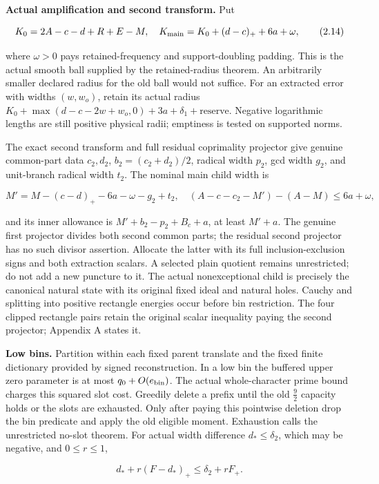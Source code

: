 \documentclass[11pt,a4paper]{article}
\begin{document}
\textbf{Actual amplification and second transform.} Put

\[
K_0=2A-c-d+R+E-M,\quad
K_{\rm main}=K_0+(d-c)_++6a+\omega,
\tag{2.14}
\]

where \(\omega>0\) pays retained-frequency and support-doubling padding.
This is the actual smooth ball supplied by the retained-radius theorem.
An arbitrarily smaller declared radius for the old ball would not
suffice. For an extracted error with widths \((w,w_o)\), retain its
actual radius \(K_0+\max(d-c-2w+w_o,0)+3a+\delta_1+\text{reserve}\).
Negative logarithmic lengths are still positive physical radii;
emptiness is tested on supported norms.

The exact second transform and full residual coprimality projector give
genuine common-part data \(c_2,d_2\), \(b_2=(c_2+d_2)/2\), radical width
\(p_2\), gcd width \(g_2\), and unit-branch radical width \(t_2\). The
nominal main child width is

\[
M'=M-(c-d)_+-6a-\omega-g_2+t_2,
\quad
(A-c-c_2-M')-(A-M)\le6a+\omega,
\tag{2.15}
\]

and its inner allowance is \(M'+b_2-p_2+B_c+a\), at least \(M'+a\). The
genuine first projector divides both second common parts; the residual
second projector has no such divisor assertion. Allocate the latter with
its full inclusion-exclusion signs and both extraction scalars. A
selected plain quotient remains unrestricted; do not add a new puncture
to it. The actual nonexceptional child is precisely the canonical
natural state with its original fixed ideal and natural holes. Cauchy
and splitting into positive rectangle energies occur before bin
restriction. The four clipped rectangle pairs retain the original scalar
inequality paying the second projector; Appendix A states it.

\textbf{Low bins.} Partition within each fixed parent translate and the
fixed finite dictionary provided by signed reconstruction. In a low bin
the buffered upper zero parameter is at most \(q_0+O(e_{\rm bin})\). The
actual whole-character prime bound charges this squared slot cost.
Greedily delete a prefix until the old \(\frac{9}{2}\) capacity holds or the
slots are exhausted. Only after paying this pointwise deletion drop the
bin predicate and apply the old eligible moment. Exhaustion calls the
unrestricted no-slot theorem. For actual width difference
\(d_*\le\delta_2\), which may be negative, and \(0\le r\le1\),

\[
d_*+r(F-d_*)_+\le\delta_2+rF_+.
\tag{2.16}
\]
\end{document}

